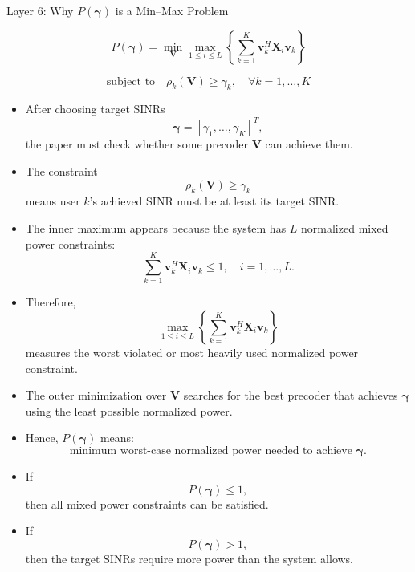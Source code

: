 \documentclass{beamer}
\begin{document}
\begin{frame}{Layer 6: Why \(P(\boldsymbol{\gamma})\) is a Min--Max Problem}
\scriptsize

\[
P(\boldsymbol{\gamma})
=
\min_{\mathbf{V}}
\max_{1\le i\le L}
\left\{
\sum_{k=1}^{K}
\mathbf{v}_k^H\mathbf{X}_i\mathbf{v}_k
\right\}
\]

\[
\text{subject to}
\quad
\rho_k(\mathbf{V})\ge \gamma_k,
\quad \forall k=1,\ldots,K
\]

\begin{itemize}
    \item After choosing target SINRs
    \[
        \boldsymbol{\gamma}=[\gamma_1,\ldots,\gamma_K]^T,
    \]
    the paper must check whether some precoder \(\mathbf{V}\) can achieve them.

    \item The constraint
    \[
        \rho_k(\mathbf{V})\ge \gamma_k
    \]
    means user \(k\)'s achieved SINR must be at least its target SINR.

    \item The inner maximum appears because the system has \(L\) normalized mixed power constraints:
    \[
        \sum_{k=1}^{K}\mathbf{v}_k^H\mathbf{X}_i\mathbf{v}_k \le 1,
        \quad i=1,\ldots,L.
    \]

    \item Therefore,
    \[
        \max_{1\le i\le L}
        \left\{
        \sum_{k=1}^{K}\mathbf{v}_k^H\mathbf{X}_i\mathbf{v}_k
        \right\}
    \]
    measures the worst violated or most heavily used normalized power constraint.

    \item The outer minimization over \(\mathbf{V}\) searches for the best precoder that achieves \(\boldsymbol{\gamma}\) using the least possible normalized power.

    \item Hence, \(P(\boldsymbol{\gamma})\) means:
    \[
        \text{minimum worst-case normalized power needed to achieve }
        \boldsymbol{\gamma}.
    \]

    \item If
    \[
        P(\boldsymbol{\gamma})\le 1,
    \]
    then all mixed power constraints can be satisfied.

    \item If
    \[
        P(\boldsymbol{\gamma})>1,
    \]
    then the target SINRs require more power than the system allows.
\end{itemize}

\end{frame}
\end{document}
